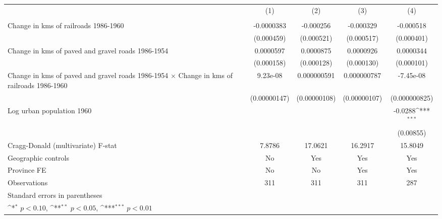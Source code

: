 {
\def\sym#1{\ifmmode^{#1}\else\(^{#1}\)\fi}
\begin{tabular}{l*{4}{c}}
\hline\hline
                &\multicolumn{1}{c}{(1)}&\multicolumn{1}{c}{(2)}&\multicolumn{1}{c}{(3)}&\multicolumn{1}{c}{(4)}\\
                &\multicolumn{1}{c}{}&\multicolumn{1}{c}{}&\multicolumn{1}{c}{}&\multicolumn{1}{c}{}\\
\hline
Change in kms of railroads 1986-1960&-0.0000383         &-0.000256         &-0.000329         &-0.000518         \\
                &(0.000459)         &(0.000521)         &(0.000517)         &(0.000401)         \\
[1em]
Change in kms of paved and gravel roads 1986-1954&0.0000597         &0.0000875         &0.0000926         &0.0000344         \\
                &(0.000158)         &(0.000128)         &(0.000130)         &(0.000101)         \\
[1em]
Change in kms of paved and gravel roads 1986-1954 $\times$ Change in kms of railroads 1986-1960& 9.23e-08         &0.000000591         &0.000000787         &-7.45e-08         \\
                &(0.00000147)         &(0.00000108)         &(0.00000107)         &(0.000000825)         \\
[1em]
Log urban population 1960&                  &                  &                  &  -0.0288\sym{***}\\
                &                  &                  &                  &(0.00855)         \\
\hline
Cragg-Donald (multivariate) F-stat&   7.8786         &  17.0621         &  16.2917         &  15.8049         \\
Geographic controls&       No         &      Yes         &      Yes         &      Yes         \\
Province FE     &       No         &       No         &      Yes         &      Yes         \\
Observations    &      311         &      311         &      311         &      287         \\
\hline\hline
\multicolumn{5}{l}{\footnotesize Standard errors in parentheses}\\
\multicolumn{5}{l}{\footnotesize \sym{*} \(p<0.10\), \sym{**} \(p<0.05\), \sym{***} \(p<0.01\)}\\
\end{tabular}
}
